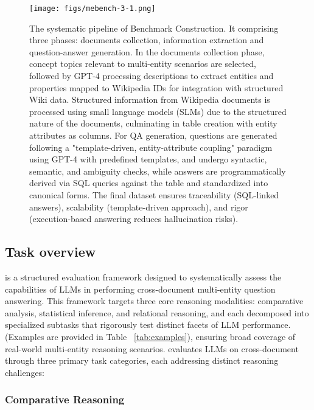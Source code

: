 \begin{figure*}[t!]
\begin{center}
\texttt{[image: figs/mebench-3-1.png]}
\end{center}
  \caption{The systematic pipeline of Benchmark Construction. It comprising three phases: documents collection, information extraction and question-answer generation. In the documents collection phase, concept topics relevant to multi-entity scenarios are selected, followed by GPT-4 processing descriptions to extract entities and properties mapped to Wikipedia IDs for integration with structured Wiki data. Structured information from Wikipedia documents is processed using small language models (SLMs) due to the structured nature of the documents, culminating in table creation with entity attributes as columns. For QA generation, questions are generated following a "template-driven, entity-attribute coupling" paradigm using GPT-4 with predefined templates, and undergo syntactic, semantic, and ambiguity checks, while answers are programmatically derived via SQL queries against the table and standardized into canonical forms. The final dataset ensures traceability (SQL-linked answers), scalability (template-driven approach), and rigor (execution-based answering reduces hallucination risks).}
  \label{fig:mepipe}
\end{figure*}

\subsection{Task overview}
\ben is a structured evaluation framework designed to systematically assess the capabilities of LLMs in performing cross-document multi-entity question answering. This framework targets three core reasoning modalities: comparative analysis, statistical inference, and relational reasoning, and each decomposed into specialized subtasks that rigorously test distinct facets of LLM performance. (Examples are provided in Table ~\ref{tab:examples}), ensuring broad coverage of real-world multi-entity reasoning scenarios. 
\ben evaluates LLMs on cross-document \meqa through three primary task categories, each addressing distinct reasoning challenges:

\subsubsection{Comparative Reasoning}

